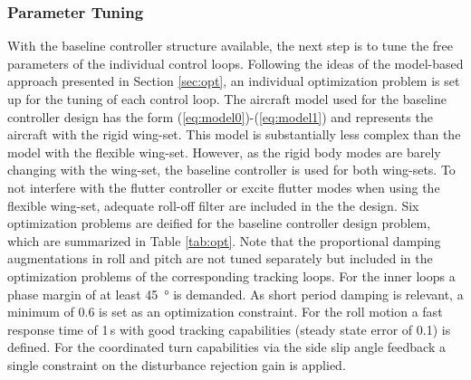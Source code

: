 \documentclass[aerospace,article,submit,moreauthors,pdftex,10pt,a4paper]{Definitions/mdpi}
\begin{document}
\subsubsection{Parameter Tuning}
With the baseline controller structure available, the next step is to tune the free parameters of the individual control loops. 
Following the  ideas of the model-based approach presented in Section \ref{sec:opt}, an individual  optimization problem is set up for the tuning of each control loop.  The aircraft model used for the baseline controller design has the form (\ref{eq:model0})-(\ref{eq:model1})  and represents the aircraft with the rigid wing-set.
This model is substantially less complex than the model with the flexible wing-set. However, as the rigid body modes are barely changing with the wing-set, the baseline controller is used for both wing-sets. To not interfere with the flutter controller or excite flutter modes when using the flexible wing-set, adequate roll-off filter are included in the the design. Six  optimization problems  are deified for the baseline controller design problem, which are summarized in Table \ref{tab:opt}.
Note that the proportional damping augmentations in roll and pitch are not tuned separately but included in the optimization problems of the corresponding tracking loops. For the inner loops a phase margin of at least \SI{45}{\degree} is demanded. As short period damping is relevant, a minimum of 0.6 is set as an optimization constraint. For the roll motion a fast response time of 1\,s with good tracking capabilities (steady state error of 0.1) is defined. For the coordinated turn capabilities  via the side slip angle feedback a single constraint on the disturbance rejection gain is applied.
\end{document}
